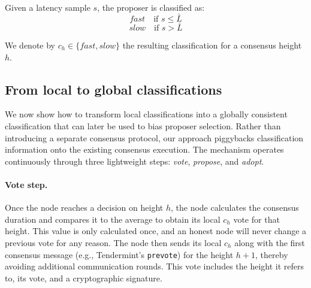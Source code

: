 
Given a latency sample $s$, the proposer is classified as:
\[
fast \quad \text{if } s \leq \bar{L}%
\]
\[
slow \quad \text{if } s > \bar{L}%
\]


We denote by $c_h \in \{fast, slow\}$ the resulting classification for a consensus height $h$.


\subsection{From local to global classifications}
\label{subsec:globalclassification}

We now show how to transform local classifications into a globally consistent classification that can later be used to bias proposer selection.
Rather than introducing a separate consensus protocol, our approach piggybacks classification information onto the existing consensus execution. 
The mechanism operates continuously through three lightweight steps: \textit{vote}, \textit{propose}, and \textit{adopt}.

\paragraph{Vote step.}
Once the node reaches a decision on height $h$, the node calculates the consensus duration and compares it to the average to obtain its local $c_h$ vote for that height. 
This value is only calculated once, and an honest node will never change a previous vote for any reason. 
The node then sends its local $c_h$ along with the first consensus message (e.g., Tendermint's \texttt{prevote}) for the height $h+1$, thereby avoiding additional communication rounds. 
This vote includes the height it refers to, its vote, and a cryptographic signature. 

